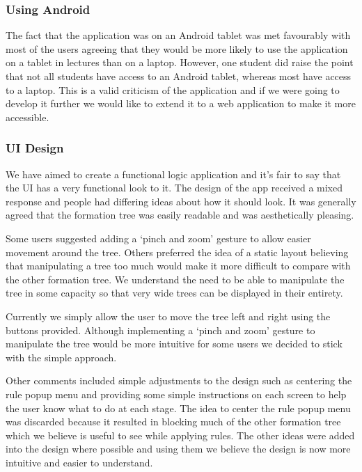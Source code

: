 \documentclass{report}
\begin{document}
\subsubsection{Using Android}

The fact that the application was on an Android tablet was met favourably with most of the users agreeing that they would be more likely to use the application on a tablet in lectures than on a laptop. However, one student did raise the point that not all students have access to an Android tablet, whereas most have access to a laptop. This is a valid criticism of the application and if we were going to develop it further we would like to extend it to a web application to make it more accessible.

\subsubsection{UI Design}

We have aimed to create a functional logic application and it's fair to say that the UI has a very functional look to it. The design of the app received a mixed response and people had differing ideas about how it should look. It was generally agreed that the formation tree was easily readable and was aesthetically pleasing. 

Some users suggested adding a `pinch and zoom' gesture to allow easier movement around the tree. Others preferred the idea of a static layout believing that manipulating a tree too much would make it more difficult to compare with the other formation tree. We understand the need to be able to manipulate the tree in some capacity so that very wide trees can be displayed in their entirety. 

Currently we simply allow the user to move the tree left and right using the buttons provided. Although implementing a `pinch and zoom' gesture to manipulate the tree would be more intuitive for some users we decided to stick with the simple approach.

Other comments included simple adjustments to the design such as centering the rule popup menu and providing some simple instructions on each screen to help the user know what to do at each stage. The idea to center the rule popup menu was discarded because it resulted in blocking much of the other formation tree which we believe is useful to see while applying rules. The other ideas were added into the design where possible and using them we believe the design is now more intuitive and easier to understand.
\end{document}
